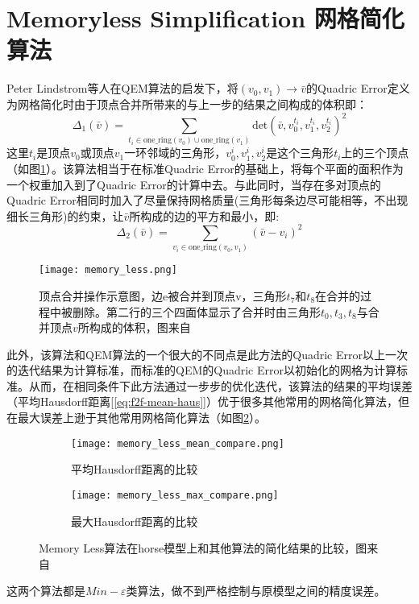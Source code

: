 \section{Memoryless Simplification 网格简化算法}
Peter Lindstrom等人在QEM算法的启发下，将$(v_0,v_1) \to \bar{v}$的Quadric Error定义为网格简化时由于顶点合并所带来的与上一步的结果之间构成的体积即：
\begin{equation}
  \Delta_1(\bar{v}) = \sum_{t_i \in \text{one\_ring}(v_0) \cup \text{one\_ring}(v_1)} \text{det} (\bar{v},v_0^{t_i},v_1^{t_i},v_2^{t_i})^2
\end{equation}
这里$t_i$是顶点$v_0$或顶点$v_1$一环邻域的三角形，$v_0^i,v_1^i, v_2^i$是这个三角形$t_i$上的三个顶点（如图\ref{fig:memory-less}）。该算法相当于在标准Quadric Error的基础上，将每个平面的面积作为一个权重加入到了Quadric Error的计算中去。与此同时，当存在多对顶点的Quadric Error相同时加入了尽量保持网格质量(三角形每条边尽可能相等，不出现细长三角形)的约束，让$\bar{v}$所构成的边的平方和最小，即:
\begin{equation}
  \Delta_2(\bar{v}) = \sum_{v_i \in \text{one\_ring} (v_0,v_1)} (\bar{v}-v_i)^2
\end{equation}
\begin{figure}[htbp]
    \centering
    \texttt{[image: memory\_less.png]}
    \caption{顶点合并操作示意图，边e被合并到顶点v，三角形$t_7$和$t_8$在合并的过程中被删除。第二行的三个四面体显示了合并时由三角形$t_0,t_3,t_8$与合并顶点$v$所构成的体积，图来自\cite{memory-less}}
    \label{fig:memory-less}
\end{figure}
此外，该算法和QEM算法的一个很大的不同点是此方法的Quadric Error以上一次的迭代结果为计算标准，而标准的QEM的Quadric Error以初始化的网格为计算标准。从而，在相同条件下此方法通过一步步的优化迭代，该算法的结果的平均误差（平均Hausdorff距离[\ref{eq:f2f-mean-haus}]）优于很多其他常用的网格简化算法，但在最大误差上逊于其他常用网格简化算法（如图\ref{fig:memory-less-compare}）。
\begin{figure}[htbp]
  \centering
  \begin{subfigure}[b]{0.8\textwidth}
    \texttt{[image: memory\_less\_mean\_compare.png]}
    \caption[input]{平均Hausdorff距离的比较}
    \end{subfigure}
    \begin{subfigure}[b]{0.8\textwidth}
      \texttt{[image: memory\_less\_max\_compare.png]}
      \caption[mls]{最大Hausdorff距离的比较}
    \end{subfigure}
    \caption[Result]{Memory Less算法在horse模型上和其他算法的简化结果的比较，图来自\cite{memory-less}}
    \label{fig:memory-less-compare}
\end{figure}
这两个算法都是$Min-\varepsilon$类算法，做不到严格控制与原模型之间的精度误差。

